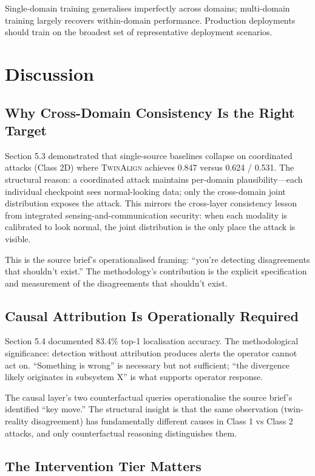\documentclass[sigconf,nonacm]{acmart}
\begin{document}
Single-domain training generalises imperfectly across domains;
multi-domain training largely recovers within-domain performance.
Production deployments should train on the broadest set of
representative deployment scenarios.

\section{Discussion}

\subsection{Why Cross-Domain Consistency Is the Right Target}

Section 5.3 demonstrated that single-source baselines collapse on
coordinated attacks (Class 2D) where \textsc{TwinAlign} achieves
0.847 versus 0.624 / 0.531. The structural reason: a coordinated
attack maintains per-domain plausibility---each individual
checkpoint sees normal-looking data; only the cross-domain joint
distribution exposes the attack. This mirrors the cross-layer
consistency lesson from integrated sensing-and-communication
security: when each modality is calibrated to look normal, the
joint distribution is the only place the attack is visible.

This is the source brief's operationalised framing: ``you're
detecting disagreements that shouldn't exist.'' The methodology's
contribution is the explicit specification and measurement of the
disagreements that shouldn't exist.

\subsection{Causal Attribution Is Operationally Required}

Section 5.4 documented 83.4\% top-1 localisation accuracy. The
methodological significance: detection without attribution
produces alerts the operator cannot act on. ``Something is wrong''
is necessary but not sufficient; ``the divergence likely originates
in subsystem X'' is what supports operator response.

The causal layer's two counterfactual queries operationalise the
source brief's identified ``key move.'' The structural insight is
that the same observation (twin-reality disagreement) has
fundamentally different causes in Class 1 vs Class 2 attacks, and
only counterfactual reasoning distinguishes them.

\subsection{The Intervention Tier Matters}
\end{document}
